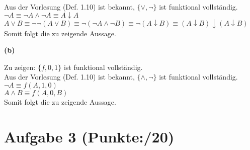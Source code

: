 \documentclass[11pt, a4paper]{article}
\newcommand{\ppp}{20}
\begin{document}
\begin{adjustwidth}{20pt}{20pt}
Aus der Vorlesung (Def. 1.10) ist bekannt,  $\{ \vee , \neg \}$ ist funktional vollständig.\\
$\neg A \equiv \neg A \wedge \neg A \equiv A \downarrow A$\\
$A \vee B \equiv \neg \neg (A \vee B) \equiv \neg (\neg A \wedge \neg B) \equiv \neg (A \downarrow B) \equiv (A \downarrow B)\downarrow(A \downarrow B)$\\
Somit folgt die zu zeigende Aussage.
\end{adjustwidth}
\textbf{(b)}
\begin{adjustwidth}{20pt}{20pt}
Zu zeigen: $\{f, 0, 1\}$ ist funktional vollständig.\\

Aus der Vorlesung (Def. 1.10) ist bekannt,  $\{ \wedge , \neg \}$ ist funktional vollständig.\\
$\neg A \equiv f(A,1,0)$\\
$A \wedge B \equiv f(A,0,B)$\\
Somit folgt die zu zeigende Aussage.
\end{adjustwidth}




\section*{Aufgabe 3 (Punkte:\qquad/\ppp)}
\end{document}
